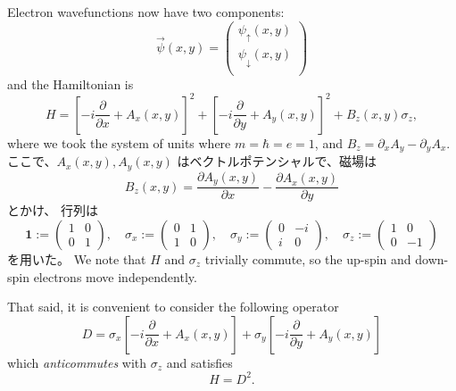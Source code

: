 \documentclass[12pt]{article}
\numberwithin{equation}{section}
\numberwithin{figure}{section}
\theoremstyle{remark}
\begin{document}
Electron wavefunctions now have two components: \begin{equation}
\vec\psi(x,y)=\begin{pmatrix}
\psi_\uparrow(x,y) \\
\psi_\downarrow(x,y) \\
\end{pmatrix}
\end{equation} and the Hamiltonian is \begin{equation}
H= \left[-i\frac{\partial}{\partial x}+ A_x(x,y)\right]^2%
+\left[-i\frac{\partial}{\partial y}+ A_y(x,y)\right]^2 %
+B_z(x,y)\sigma_z,
\end{equation} 
where we took the system of units where  $m=\hbar=e=1$,
and $B_z=\partial_x A_y-\partial_y A_x$.
ここで、$A_{x}(x,y),A_y(x,y)$ はベクトルポテンシャルで、磁場は \begin{equation}
B_z(x,y)=\frac{\partial A_y (x,y)}{\partial x} - \frac{\partial A_x(x,y)}{\partial y}
\end{equation} とかけ、
行列は\begin{equation}
\mathbf{1}:=\begin{pmatrix}
1 & 0 \\
0 & 1 
\end{pmatrix},\quad
\sigma_x:=\begin{pmatrix}
0 & 1 \\
1 & 0
\end{pmatrix}, \quad
\sigma_y:=\begin{pmatrix}
0 & -i \\
i & 0
\end{pmatrix}, \quad
\sigma_z:=\begin{pmatrix}
1 & 0 \\
0 & -1
\end{pmatrix}
\end{equation}を用いた。
\fi
We note that $H$ and $\sigma_z$ trivially commute,
so the up-spin and down-spin electrons move independently.

That said, it is convenient to consider the following operator \begin{equation}
D=\sigma_x \left[-i\frac{\partial}{\partial x} + A_x(x,y) \right]
+\sigma_y \left[-i\frac{\partial}{\partial y}+A_y(x,y)\right]
\label{PauliOp}
\end{equation}
which \emph{anticommutes} with $\sigma_z$ and satisfies 
\begin{equation}
H=D^2.
\end{equation}
\end{document}
